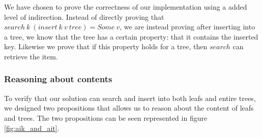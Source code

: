 We have chosen to prove the correctness of our implementation using a added level of indirection. Instead of directly proving that $search~k~(insert~k~v~ tree) = Some~v$, we are instead proving after inserting into a tree, we know that the tree has a certain property: that it contains the inserted key. Likewise we prove that if this property holds for a tree, then $search$ can retrieve the item.

\subsubsection{Reasoning about contents}
To verify that our solution can search and insert into both leafs and entire trees, we designed two propositions that allows us to reason about the content of leafs and trees. The two propositions can be seen represented in figure \ref{fig:aik_and_ait}. 

